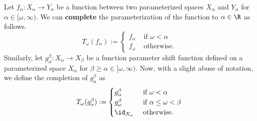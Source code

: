 Let $f_\alpha : X_\alpha\to Y_\alpha$ be a function between two parameterized spaces $X_\alpha$ and $Y_\alpha$ for $\alpha\in [\omega,\infty)$.
We can \textbf{complete} the parameterization of the function to $\alpha\in\R$ as follows.
\[ T_\omega(f_\alpha) := \begin{cases} f_\alpha&\text{ if } \omega < \alpha\\ f_\omega&\text{ otherwise.}\end{cases} \]
Similarly, let $g^\beta_\alpha : X_\alpha\to X_\beta$ be a function parameter shift function defined on a parameterized space $X_\alpha$ for $\beta\geq\alpha\in [\omega,\infty)$.
Now, with a slight abuse of notation, we define the completion of $g_\alpha^\beta$ as
\[ T_\omega(g_\alpha^\beta) := \begin{cases} g_\alpha^\beta&\text{ if } \omega < \alpha\\ g_\omega^\beta&\text{ if } \alpha\leq \omega < \beta\\ \id_{X_\omega}&\text{ otherwise.}\end{cases} \]


